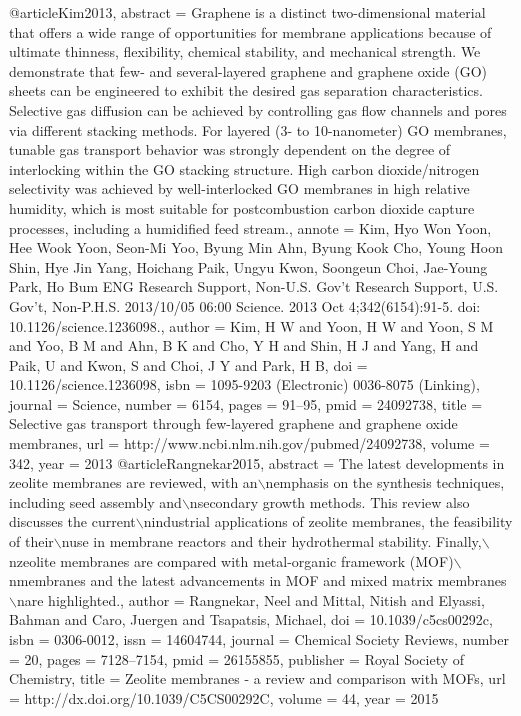 @article{Kim2013,
abstract = {Graphene is a distinct two-dimensional material that offers a wide range of opportunities for membrane applications because of ultimate thinness, flexibility, chemical stability, and mechanical strength. We demonstrate that few- and several-layered graphene and graphene oxide (GO) sheets can be engineered to exhibit the desired gas separation characteristics. Selective gas diffusion can be achieved by controlling gas flow channels and pores via different stacking methods. For layered (3- to 10-nanometer) GO membranes, tunable gas transport behavior was strongly dependent on the degree of interlocking within the GO stacking structure. High carbon dioxide/nitrogen selectivity was achieved by well-interlocked GO membranes in high relative humidity, which is most suitable for postcombustion carbon dioxide capture processes, including a humidified feed stream.},
annote = {Kim, Hyo Won
Yoon, Hee Wook
Yoon, Seon-Mi
Yoo, Byung Min
Ahn, Byung Kook
Cho, Young Hoon
Shin, Hye Jin
Yang, Hoichang
Paik, Ungyu
Kwon, Soongeun
Choi, Jae-Young
Park, Ho Bum
ENG
Research Support, Non-U.S. Gov't
Research Support, U.S. Gov't, Non-P.H.S.
2013/10/05 06:00
Science. 2013 Oct 4;342(6154):91-5. doi: 10.1126/science.1236098.},
author = {Kim, H W and Yoon, H W and Yoon, S M and Yoo, B M and Ahn, B K and Cho, Y H and Shin, H J and Yang, H and Paik, U and Kwon, S and Choi, J Y and Park, H B},
doi = {10.1126/science.1236098},
isbn = {1095-9203 (Electronic)
0036-8075 (Linking)},
journal = {Science},
number = {6154},
pages = {91--95},
pmid = {24092738},
title = {{Selective gas transport through few-layered graphene and graphene oxide membranes}},
url = {http://www.ncbi.nlm.nih.gov/pubmed/24092738},
volume = {342},
year = {2013}
}
@article{Rangnekar2015,
abstract = {The latest developments in zeolite membranes are reviewed, with an$\backslash$nemphasis on the synthesis techniques, including seed assembly and$\backslash$nsecondary growth methods. This review also discusses the current$\backslash$nindustrial applications of zeolite membranes, the feasibility of their$\backslash$nuse in membrane reactors and their hydrothermal stability. Finally,$\backslash$nzeolite membranes are compared with metal-organic framework (MOF)$\backslash$nmembranes and the latest advancements in MOF and mixed matrix membranes$\backslash$nare highlighted.},
author = {Rangnekar, Neel and Mittal, Nitish and Elyassi, Bahman and Caro, Juergen and Tsapatsis, Michael},
doi = {10.1039/c5cs00292c},
isbn = {0306-0012},
issn = {14604744},
journal = {Chemical Society Reviews},
number = {20},
pages = {7128--7154},
pmid = {26155855},
publisher = {Royal Society of Chemistry},
title = {{Zeolite membranes - a review and comparison with MOFs}},
url = {http://dx.doi.org/10.1039/C5CS00292C},
volume = {44},
year = {2015}
}
